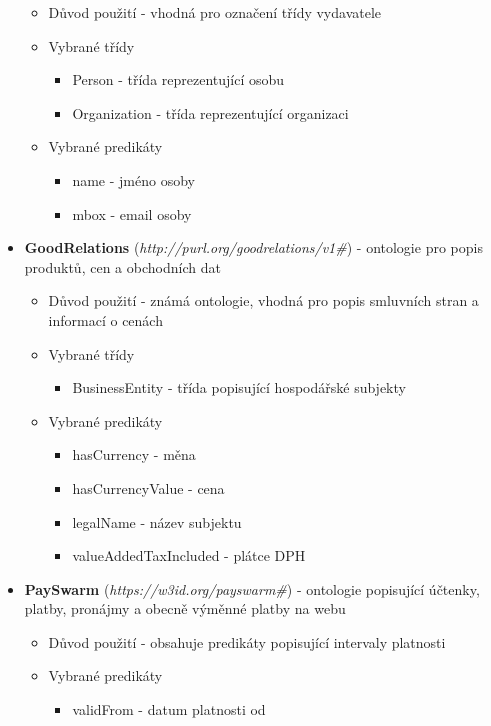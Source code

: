 \begin{itemize}
	\begin{itemize}
	\item Důvod použití - vhodná pro označení třídy vydavatele
	\item Vybrané třídy 
		\begin{itemize}
		\item Person - třída reprezentující osobu
		\item Organization - třída reprezentující organizaci 
		\end{itemize}
	\item Vybrané predikáty
		\begin{itemize}
		\item name - jméno osoby
		\item mbox - email osoby
		\end{itemize}
	\end{itemize}
\item \textbf{GoodRelations} (\textit{http://purl.org/goodrelations/v1\#}) - ontologie pro popis produktů, cen a obchodních dat
	\begin{itemize}
	\item Důvod použití - známá ontologie, vhodná pro popis smluvních stran a informací o cenách 
	\item Vybrané třídy 
		\begin{itemize}
		\item BusinessEntity - třída popisující hospodářské subjekty
		\end{itemize}
	\item Vybrané predikáty
		\begin{itemize}
		\item hasCurrency - měna
		\item hasCurrencyValue - cena
		\item legalName - název subjektu
		\item valueAddedTaxIncluded - plátce DPH
		\end{itemize}
	\end{itemize}
\item \textbf{PaySwarm} (\textit{https://w3id.org/payswarm\#}) - ontologie popisující účtenky, platby, pronájmy a obecně výměnné platby na webu
	\begin{itemize}
	\item Důvod použití - obsahuje predikáty popisující intervaly platnosti
	\item Vybrané predikáty
		\begin{itemize}
		\item validFrom - datum platnosti od

\end{itemize}
\end{itemize}
\end{itemize}
